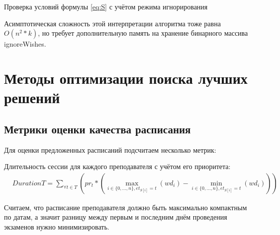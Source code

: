 \begin{algorithm} 
	\nonl{}
	\caption{Проверка условий формулы \eqref{eq:S} с учётом режима игнорирования}\label{alg:algoFindNextPr}
\end{algorithm} 

Асимптотическая сложность этой интерпретации алгоритма тоже равна ${O(n^2 * k)}$, но требует дополнительную память на хранение бинарного массива ignoreWishes. 

\section{Методы оптимизации поиска лучших решений} \label{ch2:sec4} 
\subsection{Метрики оценки качества расписания}
Для оценки предложенных расписаний подсчитаем несколько метрик:

Длительность сессии для каждого преподавателя с учётом его приоритета:
\begin{align}
	& {DurationT} =  \sum\limits_{\forall  t \in T}(pr_t* (\max\limits_{i \in \{0,...,n\}, et_{S[i]} = t}(wd_{i}) 
	- \min\limits_{i \in \{0,...,n\}, et_{S[i]} = t}(wd_{i}) )) 
\end{align}

Считаем, что расписание преподавателя должно быть максимально компактным по датам, а значит разницу между первым и последним днём проведения экзаменов нужно минимизировать.

